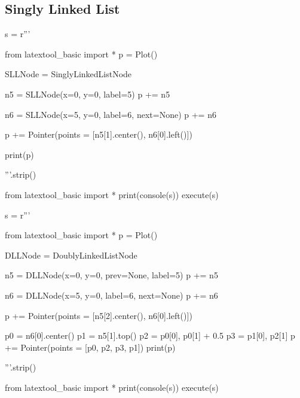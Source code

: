 \newpage
\subsection{Singly Linked List}

\begin{python}
s = r'''

from latextool_basic import *
p = Plot()

SLLNode = SinglyLinkedListNode

n5 = SLLNode(x=0, y=0, label=5)
p += n5

n6 = SLLNode(x=5, y=0, label=6, next=None)
p += n6

p += Pointer(points = [n5[1].center(), n6[0].left()])

print(p)

'''.strip()

from latextool_basic import *
print(console(s))
execute(s)
\end{python}

\newpage

\begin{python}
s = r'''

from latextool_basic import *
p = Plot()

DLLNode = DoublyLinkedListNode

n5 = DLLNode(x=0, y=0, prev=None, label=5)
p += n5

n6 = DLLNode(x=5, y=0, label=6, next=None)
p += n6

p += Pointer(points = [n5[2].center(), n6[0].left()])

p0 = n6[0].center()
p1 = n5[1].top()
p2 = p0[0], p0[1] + 0.5
p3 = p1[0], p2[1]
p += Pointer(points = [p0, p2, p3, p1])
print(p)

'''.strip()

from latextool_basic import *
print(console(s))
execute(s)
\end{python}
